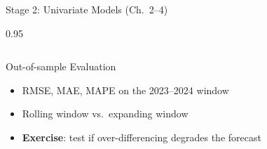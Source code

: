 \documentclass[9pt, aspectratio=169, t]{beamer}
\begin{document}
\begin{frame}{Stage 2: Univariate Models (Ch.\ 2--4)}
\begin{cminipage}{0.95\textwidth}
{\begin{columns}[T]
            \vspace{0.15cm}

            \begin{block}{Out-of-sample Evaluation}
                \begin{itemize}\setlength{\itemsep}{0pt}
                    \item RMSE, MAE, MAPE on the 2023--2024 window
                    \item Rolling window vs.\ expanding window
                    \item \textbf{Exercise}: test if over-differencing degrades the forecast
                \end{itemize}
            \end{block}
        \end{columns}
        }
    \end{cminipage}
\end{frame}
\end{document}
